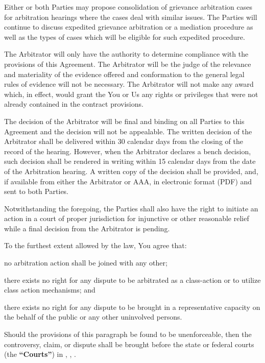 {          Either or both Parties may propose consolidation of grievance arbitration cases for arbitration hearings where the cases deal with similar issues. The Parties will continue to discuss expedited grievance arbitration or a mediation procedure as well as the types of cases which will be eligible for such expedited procedure.

          The Arbitrator will only have the authority to determine compliance with the provisions of this Agreement. The Arbitrator will be the judge of the relevance and materiality of the evidence offered and conformation to the general legal rules of evidence will not be necessary. The Arbitrator will not make any award which, in effect, would grant the You or Us any rights or privileges that were not already contained in the contract provisions.

          The decision of the Arbitrator will be final and binding on all Parties to this Agreement and the decision will not be appealable. The written decision of the Arbitrator shall be delivered within 30 calendar days from the closing of the record of the hearing. However, when the Arbitrator declares a bench decision, such decision shall be rendered in writing within 15 calendar days from the date of the Arbitration hearing. A written copy of the decision shall be provided, and, if available from either the Arbitrator or AAA, in electronic format (PDF) and sent to both Parties.

          Notwithstanding the foregoing, the Parties shall also have the right to initiate an action in a court of proper jurisdiction for injunctive or other reasonable relief while a final decision from the Arbitrator is pending.

          To the furthest extent allowed by the law, You agree that:
          \begin{longenum}
            \item no arbitration action shall be joined with any other;
            \item there exists no right for any dispute to be arbitrated as a class-action or to utilize class action mechanisms; and
            \item there exists no right for any dispute to be brought in a representative capacity on the behalf of the public or any other uninvolved persons.
          \end{longenum}
          Should the provisions of this paragraph be found to be unenforceable, then the controversy, claim, or dispute shall be brought before the state or federal courts (the \textbf{``Courts''}) in \companycity, \companystate, \companycountry.
}

